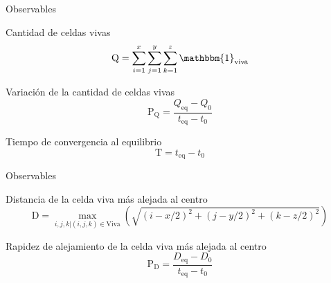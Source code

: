 \begin{frame}{Observables}

    \begin{block}{Cantidad de celdas vivas}
        \begin{equation}
            \text{Q} = \sum_{i=1}^{x} \sum_{j=1}^{y} \sum_{k=1}^{z} \mathbbm{1}_{\text{viva}}
            \label{eq:cantidad-celdas-vivas}
        \end{equation}
    \end{block}

    \begin{block}{Variación de la cantidad de celdas vivas}
        \begin{equation}
            \text{P}_{\text{Q}} = \frac{Q_{\text{eq}} - Q_{0}}{t_{\text{eq}} - t_{0}}
            \label{eq:pendiente-crecimiento-celdas-vivas}
        \end{equation}
    \end{block}

    \begin{block}{Tiempo de convergencia al equilibrio}
        \begin{equation}
            \text{T} = t_{\text{eq}} - t_{0}
            \label{eq:tiempo-convergencia-equilibrio}
        \end{equation}
    \end{block}


\end{frame}

\begin{frame}{Observables}

    \begin{block}{Distancia de la celda viva más alejada al centro}
        \begin{equation}
            \text{D} = \max_{i, j, k | (i, j, k) \in \text{Viva}} \left( \sqrt{(i - x/2)^2 + (j - y/2)^2 + (k - z/2)^2} \right)
            \label{eq:distancia-celda-viva-mas-alejada-al-centro}
        \end{equation}
    \end{block}

    \begin{block}{Rapidez de alejamiento de la celda viva más alejada al centro}
        \begin{equation}
            \text{P}_{\text{D}} = \frac{D_{\text{eq}} - D_{0}}{t_{\text{eq}} - t_{0}}
            \label{eq:rapidez-alejamiento-celda-viva-mas-alejada-al-centro}
        \end{equation}
    \end{block}


\end{frame}
